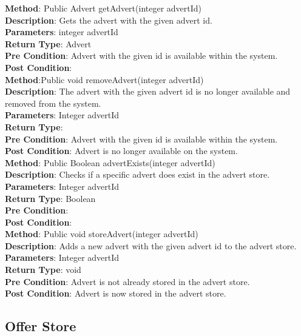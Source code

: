 \documentclass{l3deliverable}
\begin{document}
\textbf{Method}: Public Advert getAdvert(integer advertId)\\
\textbf{Description}: Gets the advert with the given advert id.\\
\textbf{Parameters}: integer advertId\\
\textbf{Return Type}: Advert\\
\textbf{Pre Condition}: Advert with the given id is available within the system. \\
\textbf{Post Condition}: \\

\textbf{Method}:Public void removeAdvert(integer advertId)\\
\textbf{Description}: The advert with the given advert id is no longer available and removed from the system.\\
\textbf{Parameters}: Integer advertId\\
\textbf{Return Type}: \\
\textbf{Pre Condition}: Advert with the given id is available within the system.\\
\textbf{Post Condition}: Advert is no longer available on the system.\\

\textbf{Method}: Public Boolean advertExists(integer advertId)\\
\textbf{Description}: Checks if a specific advert does exist in the advert store.\\
\textbf{Parameters}: Integer advertId\\
\textbf{Return Type}: Boolean\\
\textbf{Pre Condition}:\\
\textbf{Post Condition}:\\

\textbf{Method}: Public void storeAdvert(integer advertId)\\
\textbf{Description}: Adds a new advert with the given advert id to the advert store. \\
\textbf{Parameters}: Integer advertId\\
\textbf{Return Type}: void\\
\textbf{Pre Condition}: Advert is not already stored in the advert store.\\
\textbf{Post Condition}: Advert is now stored in the advert store.\\

\subsection{Offer Store}
\end{document}

